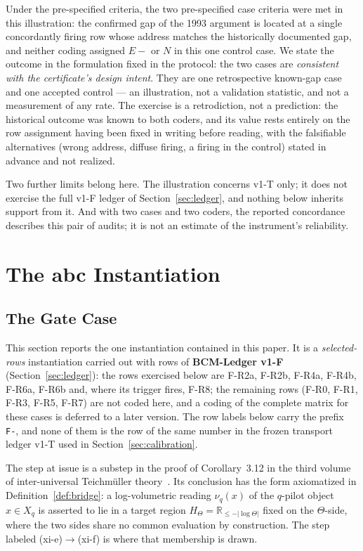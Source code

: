 \documentclass[11pt,a4paper]{article}
\begin{document}
Under the pre-specified criteria, the two pre-specified case criteria were met
in this illustration: the confirmed gap of the 1993 argument is located at a
single concordantly firing row whose address matches the historically
documented gap, and neither coding assigned $E{-}$ or $N$ in this one control
case. We state the outcome in the formulation fixed in the protocol: the two
cases are \emph{consistent with the certificate's design intent}. They are one
retrospective known-gap case and one accepted control --- an illustration, not
a validation statistic, and not a measurement of any rate. The exercise is a
retrodiction, not a prediction: the historical outcome was known to both
coders, and its value rests entirely on the row assignment having been fixed in
writing before reading, with the falsifiable alternatives (wrong address,
diffuse firing, a firing in the control) stated in advance and not realized.

Two further limits belong here. The illustration concerns v1-T only; it does
not exercise the full v1-F ledger of Section~\ref{sec:ledger}, and nothing
below inherits support from it. And with two cases and two coders, the reported
concordance describes this pair of audits; it is not an estimate of the
instrument's reliability.

\section{The abc Instantiation}\label{sec:abc}

\subsection{The Gate Case}\label{sec:abc-gate}

This section reports the one instantiation contained in this paper. It is a
\emph{selected-rows} instantiation carried out with rows of
\textbf{BCM-Ledger v1-F} (Section~\ref{sec:ledger}): the rows exercised
below are F-R2a, F-R2b, F-R4a, F-R4b, F-R6a, F-R6b and, where its trigger
fires, F-R8; the remaining rows (F-R0, F-R1, F-R3, F-R5, F-R7) are not
coded here, and a coding of the complete matrix for these cases is deferred
to a later version. The row labels below carry the prefix \texttt{F-}, and
none of them is the row of the same number in the frozen transport ledger
v1-T used in Section~\ref{sec:calibration}.

The step at issue is a substep in the proof of Corollary~3.12 in the third
volume of inter-universal Teichmüller theory~\cite{Mochizuki2021c}. Its
conclusion has the form axiomatized in Definition~\ref{def:bridge}: a
log-volumetric reading $\nu_q(x)$ of the $q$-pilot object $x \in X_q$ is
asserted to lie in a target region $H_\Theta = \mathbb{R}_{\le -|\log\Theta|}$
fixed on the $\Theta$-side, where the two sides share no common evaluation by
construction. The step labeled (xi-e)$\to$(xi-f) is where that membership is
drawn.
\end{document}
